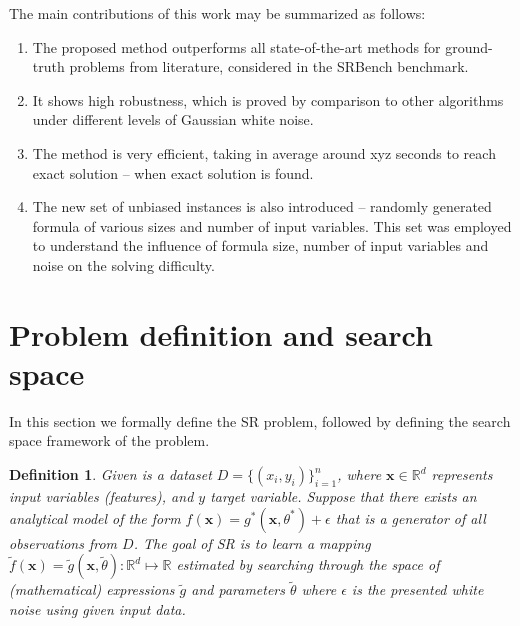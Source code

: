 \documentclass[a4paper,12pt]{elsarticle}
\newtheorem{definition}{Definition}
\begin{document}
The main contributions of this work may be summarized as follows:

\begin{enumerate}
	\item The proposed method outperforms all state-of-the-art methods for ground-truth problems from literature, considered in the SRBench benchmark. 
	
	\item It shows high robustness, which is proved by comparison to other algorithms under different levels of Gaussian white noise. 
	
	\item The method is very efficient, taking in average around xyz seconds to reach exact solution -- when exact solution is found. 
	
	\item The new set of unbiased instances is also introduced -- randomly generated formula of various sizes and number of input variables. This set was employed to understand the influence of formula size, number of input variables and noise on the solving difficulty. 
\end{enumerate}


\section{Problem definition and search space}
\label{sec:search-space}
In this section we formally define the SR problem, followed by defining the search space framework of the problem. 

\begin{definition}
  Given is a dataset $D = \{(x_i, y_i)\}_{i=1}^n$, where $\textbf{x} \in \mathbb{R}^d$ represents input variables (features), and $y$ target variable. Suppose that there exists an analytical model of the form $f(\textbf{x})= g^*(\textbf{x}, \theta^*) + \epsilon $ that is a generator of all observations from $D$.  
   The goal of SR is to learn a mapping $\tilde{f}(\textbf{x})=  \tilde{g}(\textbf{x}, \tilde{\theta})  \colon \mathbb{R}^d \mapsto \mathbb{R}$  estimated by searching through the space of (mathematical) expressions  $\tilde{g}$ and parameters $\tilde{\theta}$ where  $\epsilon$ is the presented  white noise using given input data. 
  
\end{definition}
\end{document}
